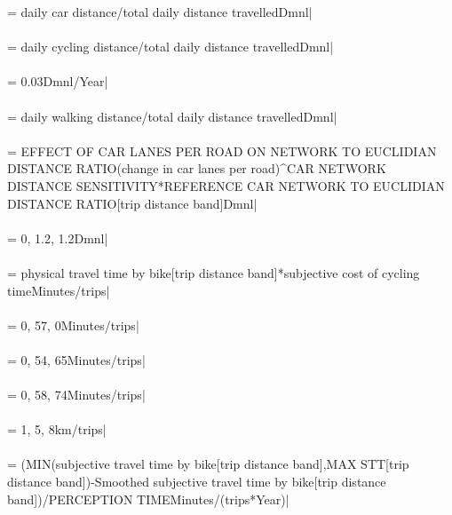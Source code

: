  = {\small daily car distance/total daily distance travelledDmnl|} \\ \\ 
 = {\small daily cycling distance/total daily distance travelledDmnl|} \\ \\ 
 = {\small 0.03Dmnl/Year|} \\ \\ 
 = {\small daily walking distance/total daily distance travelledDmnl|} \\ \\ 
 = {\small EFFECT OF CAR LANES PER ROAD ON NETWORK TO EUCLIDIAN DISTANCE RATIO(change in car lanes per road)\^{}CAR NETWORK DISTANCE SENSITIVITY*REFERENCE CAR NETWORK TO EUCLIDIAN DISTANCE RATIO[trip distance band]Dmnl|} \\ \\ 
 = {\small 0, 1.2, 1.2Dmnl|} \\ \\ 
 = {\small physical travel time by bike[trip distance band]*subjective cost of cycling timeMinutes/trips|} \\ \\ 
 = {\small 0, 57, 0Minutes/trips|} \\ \\ 
 = {\small 0, 54, 65Minutes/trips|} \\ \\ 
 = {\small 0, 58, 74Minutes/trips|} \\ \\ 
 = {\small 1, 5, 8km/trips|} \\ \\ 
 = {\small (MIN(subjective travel time by bike[trip distance band],MAX STT[trip distance band])-Smoothed subjective travel time by bike[trip distance band])/PERCEPTION TIMEMinutes/(trips*Year)|} \\ \\ 
